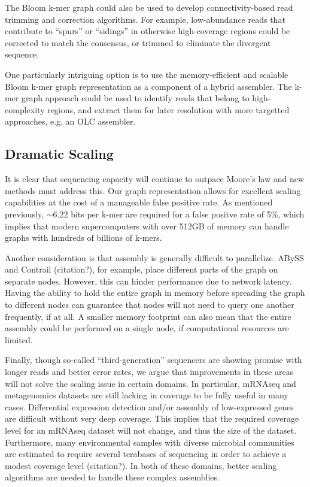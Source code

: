 \documentclass[12pt]{article} \usepackage{simplemargins}
\begin{document}
The Bloom k-mer graph could also be used to develop connectivity-based
read trimming and correction algorithms.  For example, low-abundance
reads that contribute to ``spurs'' or ``sidings'' in otherwise
high-coverage regions could be corrected to match the
consensus, or trimmed to eliminate the divergent sequence.

One particularly intriguing option is to use the memory-efficient and
scalable Bloom k-mer graph representation as a component of a hybrid
assembler.  The k-mer graph approach could be used to identify
reads that belong to high-complexity regions, and extract them for
later resolution with more targetted approaches, e.g. an OLC assembler.

\subsection{Dramatic Scaling}
It is clear that sequencing capacity will continue to outpace Moore's 
law and new methods must address this. Our graph representation allows 
for excellent scaling capabilities at the cost of a manageable false positive rate. 
As mentioned previously, $\sim 6.22$ bits per k-mer are required for a 
false positve rate of 5\%, which implies that modern supercomputers with 
over 512GB of memory can handle graphs with hundreds of billions of k-mers.

Another consideration is that assembly is generally difficult to parallelize. 
ABySS and Contrail (citation?), for example, place different parts of the 
graph on separate nodes. However, this can hinder performance due to 
network latency. Having the ability to hold the entire graph in memory 
before spreading the graph to different nodes can guarantee that nodes 
will not need to query one another frequently, if at all. A smaller memory 
footprint can also mean that the entire assembly could be performed on 
a single node, if computational resources are limited.

Finally, though so-called ``third-generation'' sequencers are showing promise with 
longer reads and better error rates, we argue that improvements in these 
areas will not solve the scaling issue in certain domains. In particular, 
mRNAseq and metagenomics datasets are still lacking in coverage to be 
fully useful in many cases. Differential expression detection and/or assembly 
of low-expressed genes are difficult without very deep coverage. This implies 
that the required coverage level for an mRNAseq dataset will not change, 
and thus the size of the dataset. Furthermore, many environmental samples with 
diverse microbial communities are estimated to require several terabases of sequencing 
in order to achieve a modest coverage level (citation?). In both of these domains, better 
scaling algorithms are needed to handle these complex assemblies. 
\end{document}
